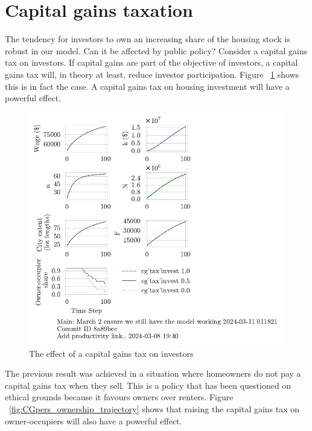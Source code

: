\section{Capital gains taxation}
The tendency for investors to own an increasing share of the housing stock is robust in our model. Can it be affected by public policy? Consider a capital gains tax on investors. If capital gains are part of the objective of investors, a capital gains tax will, in theory at least, reduce investor participation. Figure ~\ref{fig:CGinvest_ownership_trajectory} shows this is in fact the case. A capital gains tax on housing investment will have a powerful effect.
\begin{figure}[htb]
    \centering
    \includegraphics[scale=.8, trim={0 1.4cm 0 0},clip]{fig/cg_tax_invest-Main-_011821.pdf}
    \caption{The effect of a capital gains tax on investors}
    \label{fig:CGinvest_ownership_trajectory}
\end{figure}

The previous result was achieved in a situation where homeowners do not pay a capital gains tax when they sell. This is a policy that has been questioned on ethical grounds because it favours owners over renters.  Figure ~\ref{fig:CGpers_ownership_trajectory} shows that raising the capital gains tax on owner-occupiers will also have a powerful effect. 

